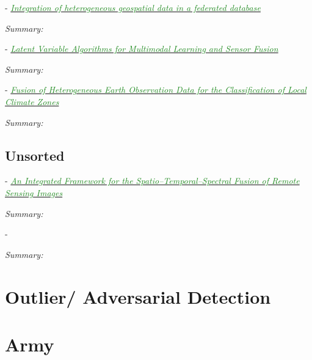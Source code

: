 \documentclass[]{article}
\newcommand{\paperentry}[4]{
            \hangindent=1cm
            \cite{#1} - \href{run:../References/#3}{\textcolor{ForestGreen}{\textit{#2}}}
            
            \noindent            
            \begin{minipage}[t]{0.1\linewidth}\hfill\end{minipage}
            \begin{minipage}[t]{0.8\linewidth}\textcolor{NavyBlue}{{\textit{Summary:}}}#4\end{minipage}
            \vspace{.25cm}
          }
\begin{document}
		\paperentry{Butenuth2007HeterogeneousGeospatialData}
		{Integration of heterogeneous geospatial data in a federated database}
		{Fusion/Butenuth2007HeterogeneousGeospatialData.pdf}
		{}
		
			
		\paperentry{Guo2019LVAforMultimodalLearningandSensorFusion}
		{Latent Variable Algorithms for Multimodal Learning and Sensor Fusion}
		{Fusion/Guo2019LVAforMultimodalLearningandSensorFusion.pdf}
		{}
		
		\paperentry{Zhang2019FusionHeteroEarthObsClimateZones}
		{Fusion of Heterogeneous Earth Observation Data for the Classification of Local Climate Zones}
		{Fusion/Zhang2019FusionHeteroEarthObsClimateZones.pdf}
		{}
	
	\subsection{Unsorted}
	
	\paperentry{Shen2016SpatioTemporalSpectralFusion}
	{An Integrated Framework for the Spatio–Temporal–Spectral Fusion of Remote Sensing Images}
	{Fusion/Shen2016SpatioTemporalSpectralFusion.pdf}
	{}
	
	
	\paperentry{}
	{}
	{}
	{}
	
	


\section{Outlier/ Adversarial Detection}

\section{Army}
\end{document}
